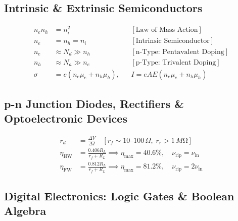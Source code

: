 \documentclass[10pt,twoside,openright]{book}
\begin{document}
\subsection{Intrinsic \& Extrinsic Semiconductors}

\begin{formulabox}
\begin{align}
  n_e n_h &= n_i^2 && [\text{Law of Mass Action}] \\
  n_e &= n_h = n_i && [\text{Intrinsic Semiconductor}] \\
  n_e &\approx N_d \gg n_h && [\text{n-Type: Pentavalent Doping}] \\
  n_h &\approx N_a \gg n_e && [\text{p-Type: Trivalent Doping}] \\
  \sigma &= e(n_e \mu_e + n_h \mu_h), && I = e A E(n_e \mu_e + n_h \mu_h)
\end{align}
\end{formulabox}

\subsection{p-n Junction Diodes, Rectifiers \& Optoelectronic Devices}

\begin{formulabox}
\begin{align}
  r_d &= \frac{\Delta V}{\Delta I} \quad [r_f \sim 10\text{--}100\,\Omega,\; r_r > 1\,\si{M\ohm}] \\
  \eta_{\text{HW}} &= \frac{0.406 R_L}{r_f + R_L} \implies \eta_{\max} = 40.6\%, \quad \nu_{\text{rip}} = \nu_{\text{in}} \\
  \eta_{\text{FW}} &= \frac{0.812 R_L}{r_f + R_L} \implies \eta_{\max} = 81.2\%, \quad \nu_{\text{rip}} = 2\nu_{\text{in}}
\end{align}
\end{formulabox}

\subsection{Digital Electronics: Logic Gates \& Boolean Algebra}
\end{document}
